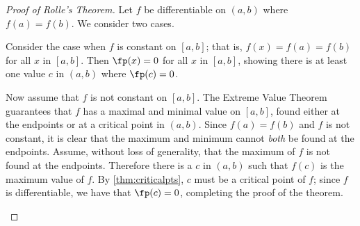 \begin{proof}[Proof of Rolle's Theorem]
Let $f$ be differentiable on $(a,b)$ where $f(a)=f(b)$. We consider two cases. 

\begin{description}[leftmargin=0pt]
\item[Case 1:] Consider the case when $f$ is constant on $[a,b]$; that is, $f(x) = f(a) = f(b)$ for all $x$ in $[a,b]$. Then $\fp(x) = 0$ for all $x$ in $[a,b]$, showing there is at least one value $c$ in $(a,b)$ where $\fp(c)=0$.

\item[Case 2:] Now assume that $f$ is not constant on $[a,b]$. The Extreme Value Theorem guarantees that $f$ has a maximal and minimal value on $[a,b]$, found either at the endpoints or at a critical point in $(a,b)$. Since $f(a)=f(b)$ and $f$ is not constant, it is clear that the maximum and minimum cannot \emph{both} be found at the endpoints. Assume, without loss of generality, that the maximum of $f$ is not found at the endpoints. Therefore there is a $c$ in $(a,b)$ such that $f(c)$ is the maximum value of $f$. By \autoref{thm:criticalpts}, $c$ must be a critical point of $f$; since $f$ is differentiable, we have that $\fp(c) = 0$, completing the proof of the theorem.\qedhere
\end{description}
\end{proof}


